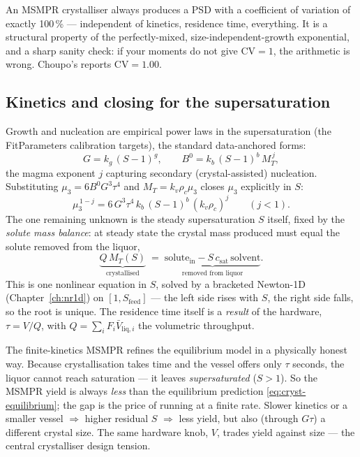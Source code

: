 \documentclass[11pt,a4paper]{article}
\begin{document}
\begin{keyidea}
An MSMPR crystalliser always produces a PSD with a coefficient of
variation of exactly 100\,\% --- independent of kinetics, residence
time, everything.  It is a structural property of the perfectly-mixed,
size-independent-growth exponential, and a sharp sanity check: if your
moments do not give $\mathrm{CV}=1$, the arithmetic is wrong.  Choupo's
 reports $\mathrm{CV}=1.00$.
\end{keyidea}

\subsection{Kinetics and closing for the supersaturation}

Growth and nucleation are empirical power laws in the supersaturation
(the FitParameters calibration targets), the standard data-anchored
forms:
\begin{equation}
   G = k_g\,(S-1)^g, \qquad
   B^0 = k_b\,(S-1)^b\,M_T^{\,j},
\end{equation}
the magma exponent $j$ capturing secondary (crystal-assisted)
nucleation.  Substituting $\mu_3 = 6 B^0 G^3 \tau^4$ and $M_T = k_v
\rho_c \mu_3$ closes $\mu_3$ explicitly in $S$:
\begin{equation}
   \mu_3^{\,1-j} = 6\,G^3\tau^4\,k_b\,(S-1)^b\,(k_v\rho_c)^j
   \qquad (j<1).
\end{equation}
The one remaining unknown is the steady supersaturation $S$ itself,
fixed by the \emph{solute mass balance}: at steady state the crystal
mass produced must equal the solute removed from the liquor,
\begin{equation}
   \underbrace{Q\,M_T(S)}_{\text{crystallised}}
   \;=\;
   \underbrace{\text{solute}_{\text{in}} - S\,c_{\text{sat}}\,\text{solvent}}_{\text{removed from liquor}}.
   \label{eq:cryst-closure}
\end{equation}
This is one nonlinear equation in $S$, solved by a bracketed
Newton-1D (Chapter~\ref{ch:nr1d}) on $[1, S_{\text{feed}}]$ --- the
left side rises with $S$, the right side falls, so the root is unique.
The residence time itself is a \emph{result} of the hardware,
$\tau = V/Q$, with $Q=\sum_i F_i \bar V_{\text{liq},i}$ the volumetric
throughput.

\begin{intuition}
The finite-kinetics MSMPR refines the equilibrium model in a physically
honest way.  Because crystallisation takes time and the vessel offers
only $\tau$ seconds, the liquor cannot reach saturation --- it leaves
\emph{supersaturated} ($S>1$).  So the MSMPR yield is always
\emph{less} than the equilibrium prediction \eqref{eq:cryst-equilibrium};
the gap is the price of running at a finite rate.  Slower kinetics or a
smaller vessel $\Rightarrow$ higher residual $S$ $\Rightarrow$ less
yield, but also (through $G\tau$) a different crystal size.  The same
hardware knob, $V$, trades yield against size --- the central
crystalliser design tension.
\end{intuition}
\end{document}
